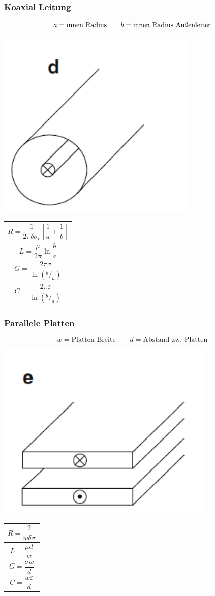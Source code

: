 \subsubsection{Koaxial Leitung}
\[
    a = \text{innen Radius} \qquad b = \text{innen Radius Außenleiter} \\
\]

\includegraphics[width=0.4\columnwidth]{Figures/Koaxialleitung.png}
{\renewcommand*{\arraystretch}{0.2}
\begin{tabularx}{0.5\columnwidth}{|X|}
    \hline
    \[R=\frac{1}{2\pi\delta\sigma_c}\left[\frac{1}{a}+\frac{1}{b}\right]\] \\
    \hline
    \[L=\frac{\mu}{2\pi}\ln\frac{b}{a}\]                                   \\
    \hline
    \[G=\frac{2\pi\sigma}{\ln(^b/_a)}\]                                    \\
    \hline
    \[C=\frac{2\pi\varepsilon}{\ln(^b/_a)}\]                               \\
    \hline
\end{tabularx}}

\subsubsection{Parallele Platten}
\[
    w  = \text{Platten Breite} \qquad d  = \text{Abstand zw. Platten}
\]

\includegraphics[width=0.4\columnwidth]{Figures/Parallele_Platten.png}
{\renewcommand*{\arraystretch}{0.2}
\begin{tabularx}{0.5\columnwidth}{|X|}
    \hline
    \[R=\frac{2}{w\delta\sigma}\] \\
    \hline
    \[L=\frac{\mu d}{w}\]          \\
    \hline
    \[G=\frac{\sigma w}{d}\]       \\
    \hline
    \[C=\frac{w\varepsilon}{d}\]  \\
    \hline
\end{tabularx}}

